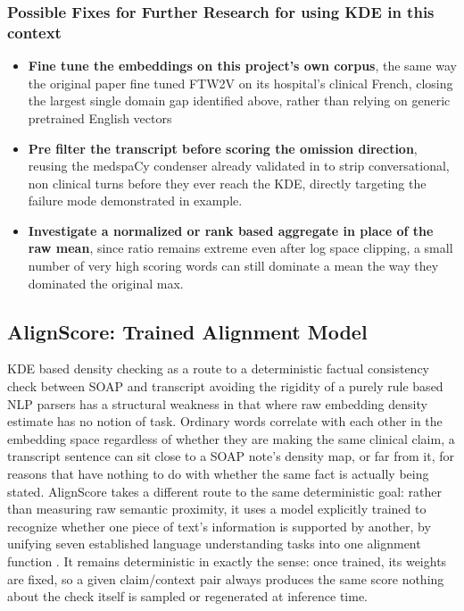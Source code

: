 \documentclass[11pt,a4paper]{article}
\begin{document}
\subsubsection{Possible Fixes for Further Research for using KDE in this context}
\begin{itemize}
    \item \textbf{Fine tune the embeddings on this project's own corpus}, the same way the original paper fine tuned FTW2V on its hospital's clinical French, closing the largest single domain gap identified above, rather than relying on generic pretrained English vectors
    \item \textbf{Pre filter the transcript before scoring the omission direction}, reusing the medspaCy condenser already validated in  to strip conversational, non clinical turns before they ever reach the KDE, directly targeting the failure mode demonstrated in  example. 
    \item  \textbf{Investigate a normalized or rank based aggregate in place of the raw mean}, since  ratio remains extreme even after log space clipping,  a small number of very high scoring words can still dominate a mean the way they dominated the original max. 
\end{itemize}

\subsection{AlignScore: Trained Alignment Model}
\label{sec:AlignScore: trained alignment Model}

 KDE based density checking as a route to a deterministic factual consistency check between SOAP and transcript avoiding the rigidity of a purely rule based NLP parsers has a  structural weakness in that where raw embedding density estimate has no notion of task. Ordinary words correlate with each other in the embedding space regardless of whether they are making the same clinical claim,  a transcript sentence can sit close to a SOAP note's density map, or far from it, for reasons that have nothing to do with whether the same fact is actually being stated. AlignScore takes a different route to the same deterministic goal: rather than measuring raw semantic proximity, it uses a model explicitly trained to recognize whether one piece of text's information is supported by another, by unifying seven established language understanding tasks into one alignment function \cite{zha2023alignscore} . It remains deterministic in exactly the sense: once trained, its weights are fixed, so a given claim/context pair always produces the same score nothing about the check itself is sampled or regenerated at inference time.
\end{document}
